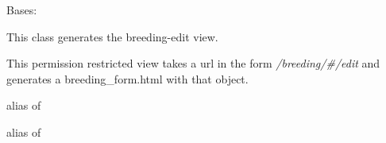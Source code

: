 \documentclass[letterpaper,10pt,english]{sphinxmanual}
\begin{document}

\begin{fulllineitems}
\label{api:mousedb.animal.views.BreedingUpdate}
Bases: {\hyperref[api:mousedb.views.RestrictedUpdateView]{}}

This class generates the breeding-edit view.

This permission restricted view takes a url in the form \emph{/breeding/\#/edit} and generates a breeding\_form.html with that object.


\begin{fulllineitems}
\label{api:mousedb.animal.views.BreedingUpdate.form_class}
alias of 

\end{fulllineitems}



\begin{fulllineitems}
\label{api:mousedb.animal.views.BreedingUpdate.model}
alias of 

\end{fulllineitems}


\end{fulllineitems}


\end{document}
